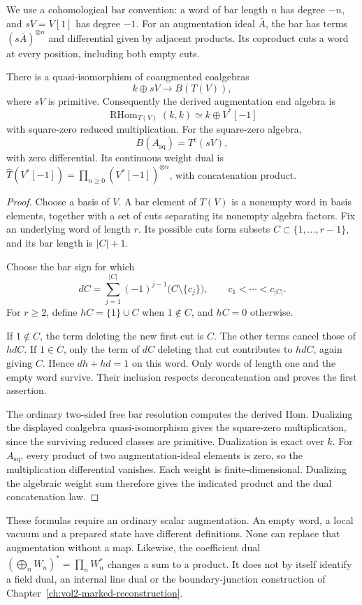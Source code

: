 We use a cohomological bar convention: a word of bar length $n$
has degree $-n$, and $sV=V[1]$ has degree $-1$.
For an augmentation ideal $\bar A$, the bar has terms
$(s\bar A)^{\otimes n}$ and differential given by adjacent products.
Its coproduct cuts a word at every position, including both empty cuts.

\begin{proposition}\label{prop:vol2-free-bar}
There is a quasi-isomorphism of coaugmented coalgebras
\[
 k\oplus sV\longrightarrow B(T(V)),
\]
where $sV$ is primitive.
Consequently the derived augmentation end algebra is
\[
 \operatorname{RHom}_{T(V)}(k,k)
 \simeq k\oplus V^*[-1]
\]
with square-zero reduced multiplication.
For the square-zero algebra,
\[
 B(A_{\mathrm{sq}})=T^c(sV),
\]
with zero differential. Its continuous weight dual is
$\widehat T(V^*[-1])=\prod_{n\ge0}(V^*[-1])^{\otimes n}$,
with concatenation product.
\end{proposition}
\begin{proof}
Choose a basis of $V$.
A bar element of $T(V)$ is a nonempty word in basis elements,
together with a set of cuts separating its nonempty algebra factors.
Fix an underlying word of length $r$.
Its possible cuts form subsets
$C\subset\{1,\ldots,r-1\}$, and its bar length is $|C|+1$.

Choose the bar sign for which
\[
 dC=\sum_{j=1}^{|C|}(-1)^{j-1}
       \bigl(C\setminus\{c_j\}\bigr),
 \qquad c_1<\cdots<c_{|C|}.
\]
For $r\ge2$, define $hC=\{1\}\cup C$ when $1\notin C$, and
$hC=0$ otherwise.

If $1\notin C$, the term deleting the new first cut is $C$.
The other terms cancel those of $hdC$.
If $1\in C$, only the term of $dC$ deleting that cut contributes
to $hdC$, again giving $C$.
Hence $dh+hd=1$ on this word.
Only words of length one and the empty word survive.
Their inclusion respects deconcatenation and proves the first assertion.

The ordinary two-sided free bar resolution computes the derived Hom.
Dualizing the displayed coalgebra quasi-isomorphism gives the
square-zero multiplication, since the surviving reduced classes are
primitive. Dualization is exact over $k$.
For $A_{\mathrm{sq}}$, every product of two augmentation-ideal
elements is zero, so the multiplication differential vanishes.
Each weight is finite-dimensional. Dualizing the algebraic weight sum
therefore gives the indicated product and the dual concatenation law.
\end{proof}

These formulas require an ordinary scalar augmentation.
An empty word, a local vacuum and a prepared state have different
definitions. None can replace that augmentation without a map.
Likewise, the coefficient dual
$(\bigoplus_n W_n)^*=\prod_n W_n^*$ changes a sum to a product.
It does not by itself identify a field dual, an internal line dual
or the boundary-junction construction of
Chapter~\ref{ch:vol2-marked-reconstruction}.

